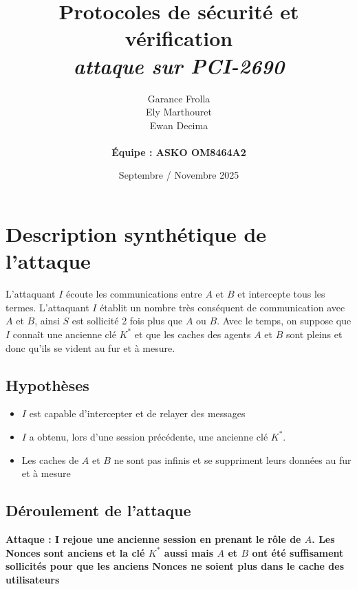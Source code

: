 \documentclass[11pt]{article}
\begin{document}
\title{\textbf{Protocoles de sécurité et vérification} \\
{\small \textit{attaque sur PCI-2690}}}

\author{Garance Frolla \\ Ely Marthouret \\ Ewan Decima \\\\ \textbf{Équipe : ASKO OM8464A2}}
\date{Septembre / Novembre 2025}

\maketitle
\tableofcontents
\newpage


\section{Description synthétique de l'attaque}

L'attaquant $I$ écoute les communications entre $A$ et $B$ et intercepte tous les termes. L'attaquant $I$ établit un nombre très conséquent de communication avec $A$ et $B$, ainsi $S$ est sollicité 2 fois plus que $A$ ou $B$. Avec le temps, on suppose que $I$ connaît une ancienne clé $K^*$ et que les caches des agents $A$ et $B$ sont pleins et donc qu'ils se vident au fur et à mesure.

\subsection{Hypothèses}
\begin{itemize}
    \item $I$ est capable d'intercepter et de relayer des messages 
    \item $I$ a obtenu, lors d'une session précédente, une ancienne clé $K^*$.
    \item Les caches de $A$ et $B$ ne sont pas infinis et se suppriment leurs données au fur et à mesure

    

\end{itemize}

\subsection{Déroulement de l'attaque}

\textbf{Attaque : I rejoue une ancienne session en prenant le rôle de $A$. Les Nonces sont anciens et la clé $K^*$ aussi mais $A$ et $B$ ont été suffisament sollicités pour que les anciens Nonces ne soient plus dans le cache des utilisateurs}
\end{document}
